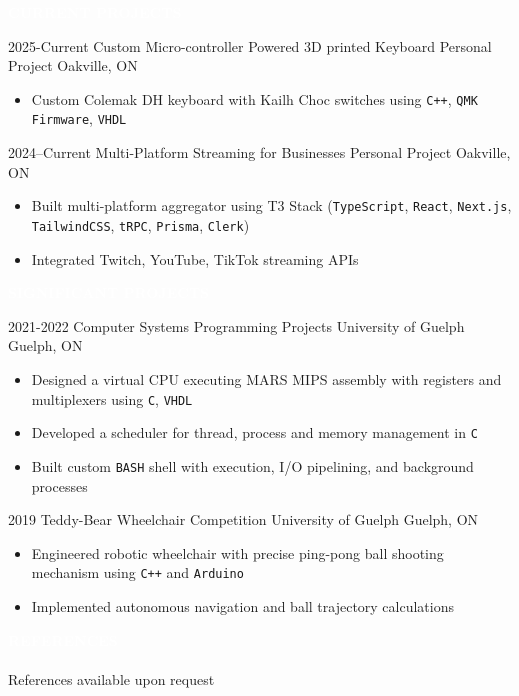 \documentclass[9pt]{src/developercv} %
\begin{document}

	\colorbox{sky800}{\textcolor{white}{\LARGE\MakeUppercase{\textbf{Current Projects}}}}\\%
	\begin{entrylist}
		\atsentry
			{2025-Current}
			{Custom Micro-controller Powered 3D printed Keyboard}
			{Personal Project}
			{Oakville, ON}
			{
				\vspace{-1.0\baselineskip}
				\begin{itemize}
					\item Custom Colemak DH keyboard with Kailh Choc switches using \texttt{C++}, \texttt{QMK Firmware}, \texttt{VHDL}
				\end{itemize}
			}
		\atsentry
			{2024--Current}
			{Multi-Platform Streaming for Businesses}
			{Personal Project}
			{Oakville, ON}
			{
				\vspace{-1.0\baselineskip}
				\begin{itemize}
					\item Built multi-platform aggregator using T3 Stack (\texttt{TypeScript}, \texttt{React}, \texttt{Next.js}, \texttt{TailwindCSS}, \texttt{tRPC}, \texttt{Prisma}, \texttt{Clerk})
					\item Integrated Twitch, YouTube, TikTok streaming APIs
				\end{itemize}
			}
	\end{entrylist}

	\colorbox{sky700}{\textcolor{white}{\LARGE\MakeUppercase{\textbf{Significant Projects}}}}\\%
	\begin{entrylist}
		\atsentry
			{2021-2022}
			{Computer Systems Programming Projects}
			{University of Guelph}
			{Guelph, ON}
			{
				\vspace{-1.0\baselineskip}
				\begin{itemize}
					\item Designed a virtual CPU executing MARS MIPS assembly with registers and multiplexers using \texttt{C}, \texttt{VHDL}
					\item Developed a scheduler for thread, process and memory management in \texttt{C}
					\item Built custom \texttt{BASH} shell with execution, I/O pipelining, and background processes
				\end{itemize}
			}
		\atsentry
			{2019}
			{Teddy-Bear Wheelchair Competition}
			{University of Guelph}
			{Guelph, ON}
			{
				\vspace{-1.0\baselineskip}
				\begin{itemize}
					\item Engineered robotic wheelchair with precise ping-pong ball shooting mechanism using \texttt{C++} and \texttt{Arduino}
					\item Implemented autonomous navigation and ball trajectory calculations
				\end{itemize}
			}
	\end{entrylist}

	\vspace{1.5\baselineskip}
	\colorbox{sky500}{\textcolor{white}{\LARGE\MakeUppercase{\textbf{References}}}}\\\\
	{\large References available upon request}
\end{document}
